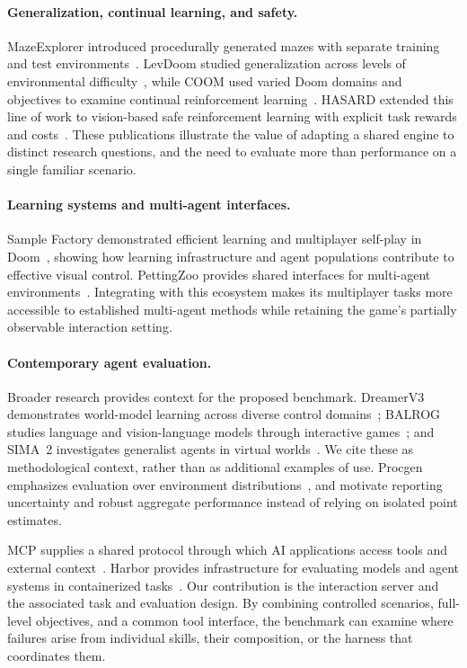 \paragraph{Generalization, continual learning, and safety.}
MazeExplorer introduced procedurally generated \vzd{} mazes with separate training and test environments~\citep{harries2019mazeexplorer}. LevDoom studied generalization across levels of environmental difficulty~\citep{tomilin2022levdoom}, while COOM used varied Doom domains and objectives to examine continual reinforcement learning~\citep{tomilin2023coom}. HASARD extended this line of work to vision-based safe reinforcement learning with explicit task rewards and costs~\citep{tomilin2025hasard}. These publications illustrate the value of adapting a shared engine to distinct research questions, and the need to evaluate more than performance on a single familiar scenario.

\paragraph{Learning systems and multi-agent interfaces.}
Sample Factory demonstrated efficient learning and multiplayer self-play in Doom~\citep{petrenko2020samplefactory}, showing how learning infrastructure and agent populations contribute to effective visual control. PettingZoo provides shared interfaces for multi-agent environments~\citep{terry2021pettingzoo}. Integrating \vzd{} with this ecosystem makes its multiplayer tasks more accessible to established multi-agent methods while retaining the game's partially observable interaction setting.

\paragraph{Contemporary agent evaluation.}
Broader research provides context for the proposed benchmark. DreamerV3 demonstrates world-model learning across diverse control domains~\citep{hafner2025dreamer}; BALROG studies language and vision-language models through interactive games~\citep{paglieri2025balrog}; and SIMA~2 investigates generalist agents in virtual worlds~\citep{sima2025}. We cite these as methodological context, rather than as additional examples of \vzd{} use. Procgen emphasizes evaluation over environment distributions~\citep{cobbe2020procgen}, and \citet{agarwal2021precipice} motivate reporting uncertainty and robust aggregate performance instead of relying on isolated point estimates.

MCP supplies a shared protocol through which AI applications access tools and external context~\citep{mcprotocol}. Harbor provides infrastructure for evaluating models and agent systems in containerized tasks~\citep{harborframework}. Our contribution is the \vzd{} interaction server and the associated task and evaluation design. By combining controlled scenarios, full-level objectives, and a common tool interface, the benchmark can examine where failures arise from individual skills, their composition, or the harness that coordinates them.
